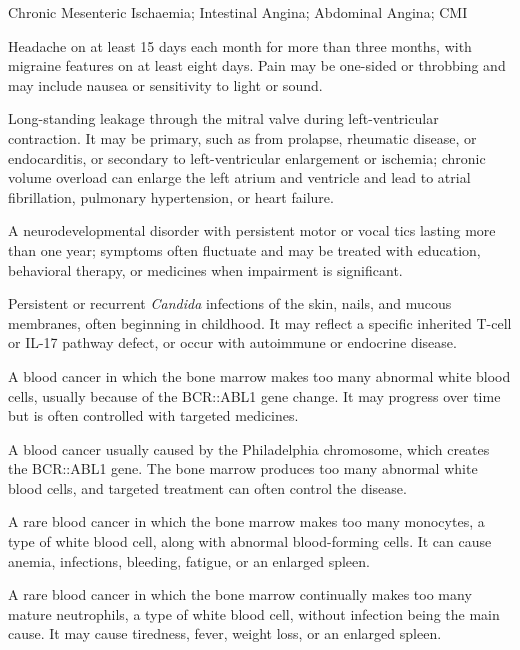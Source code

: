 \synonyms
Chronic Mesenteric Ischaemia; Intestinal Angina; Abdominal Angina; CMI

 Headache on at least 15 days each month for more than three months, with migraine features on at least eight days. Pain may be one-sided or throbbing and may include nausea or sensitivity to light or sound.

 Long-standing leakage through the mitral valve during left-ventricular contraction. It may be primary, such as from prolapse, rheumatic disease, or endocarditis, or secondary to left-ventricular enlargement or ischemia; chronic volume overload can enlarge the left atrium and ventricle and lead to atrial fibrillation, pulmonary hypertension, or heart failure.

 A neurodevelopmental disorder with persistent motor or vocal tics lasting more than one year; symptoms often fluctuate and may be treated with education, behavioral therapy, or medicines when impairment is significant.

 Persistent or recurrent \textit{Candida} infections of the skin, nails, and mucous membranes, often beginning in childhood. It may reflect a specific inherited T-cell or IL-17 pathway defect, or occur with autoimmune or endocrine disease.

 A blood cancer in which the bone marrow makes too many abnormal white blood cells, usually because of the BCR::ABL1 gene change. It may progress over time but is often controlled with targeted medicines.

 A blood cancer usually caused by the Philadelphia chromosome, which creates the BCR::ABL1 gene. The bone marrow produces too many abnormal white blood cells, and targeted treatment can often control the disease.

 A rare blood cancer in which the bone marrow makes too many monocytes, a type of white blood cell, along with abnormal blood-forming cells. It can cause anemia, infections, bleeding, fatigue, or an enlarged spleen.

 A rare blood cancer in which the bone marrow continually makes too many mature neutrophils, a type of white blood cell, without infection being the main cause. It may cause tiredness, fever, weight loss, or an enlarged spleen.

